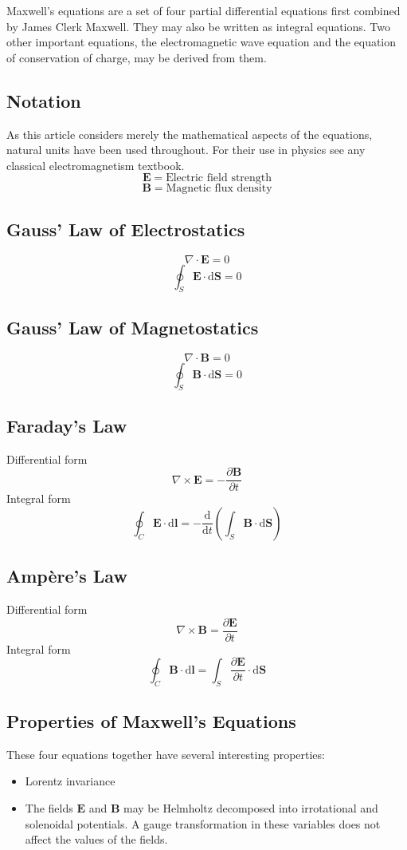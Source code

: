 \documentclass[12pt]{article}
\begin{document}
Maxwell's equations are a set of four partial differential equations first combined by James Clerk Maxwell. They may also be written as integral equations. Two other important equations, the electromagnetic wave equation and the equation of conservation of charge, may be derived from them.
\subsection{Notation}
As this article considers merely the mathematical aspects of the equations, natural units have been used throughout. For their use in physics see any classical electromagnetism textbook.
\[
\mathbf{E} = \mbox{Electric field strength}
\]
\[
\mathbf{B} = \mbox{Magnetic flux density}
\]
\subsection{Gauss' Law of Electrostatics}
\[
\nabla \cdot \mathbf{E} = 0
\]
\[
\oint_S  \mathbf{E} \cdot \mathrm{d}\mathbf{S} = 0
\]
\subsection{Gauss' Law of Magnetostatics}
\[
\nabla \cdot \mathbf{B} = 0
\]
\[
\oint_S \mathbf{B} \cdot \mathrm{d}\mathbf{S} = 0
\]
\subsection{Faraday's Law}
Differential form
\[
\nabla \times \mathbf{E} = -\frac{ \partial \mathbf{B}}{\partial t}
\]
Integral form
\[
\oint_{C} \mathbf{E} \cdot \mathrm{d}\mathbf{l} = -  \frac{\mathrm{d}}{\mathrm{d} t} \left( \int_{S} \mathbf{B} \cdot \mathrm{d}\mathbf{S} \right)
\]
\subsection{Amp\`ere's Law}
Differential form
\[
\nabla \times \mathbf{B} = \frac{ \partial \mathbf{E}}{\partial t}
\]
Integral form
\[
\oint_C \mathbf{B} \cdot \mathrm{d}\mathbf{l} = \int_S \frac{\partial \mathbf{E}}{\partial t} \cdot \mathrm{d} \mathbf{S}
\]
\subsection{Properties of Maxwell's Equations}
These four equations together have several interesting properties:
\begin{itemize}
\item Lorentz invariance
\item The fields $\mathbf{E}$ and $\mathbf{B}$ may be Helmholtz decomposed into irrotational and solenoidal potentials. A gauge transformation in these variables does not affect the values of the fields.
\end{itemize}
\end{document}

